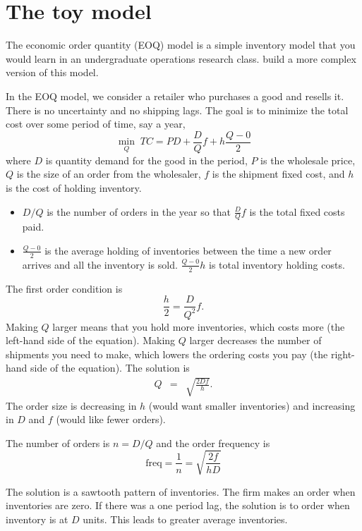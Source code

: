 \documentclass[11pt, pdftex]{article}
\begin{document}
\section{The toy model}
The economic order quantity (EOQ) model is a simple inventory model that you would learn in an undergraduate operations research class. \citet{alessandriaInvetories} build a more complex version of this model.

In the EOQ model, we consider a retailer who purchases a good and resells it. There is no uncertainty and no shipping lags. The goal is to minimize the total cost over some period of time, say a year,
\begin{equation}
  \min_Q \;TC = PD + \frac{D}{Q}f + h\frac{Q-0}{2}
\end{equation}
where $D$ is quantity demand for the good in the period, $P$ is the wholesale price, $Q$ is the size of an order from the wholesaler, $f$ is the shipment fixed cost, and $h$ is the cost of holding inventory. 
\begin{itemize}
  \item $D/Q$ is the number of orders in the year so that $\frac{D}{Q} f$ is the total fixed costs paid.
  \item $\frac{Q-0}{2}$ is the average holding of inventories between the time a new order arrives and all the inventory is sold. $\frac{Q-0}{2}h$ is total inventory holding costs.
\end{itemize}
The first order condition is
\begin{equation}\label{}
  \frac{h}{2}=\frac{D}{Q^2}f.
\end{equation}
Making $Q$ larger means that you hold more inventories, which costs more (the left-hand side of the equation). Making $Q$ larger decreases the number of shipments you need to make, which lowers the ordering costs you pay (the right-hand side of  the equation). 
The solution is
\begin{eqnarray}
  Q &=& \sqrt{\frac{2Df}{h}}.
\end{eqnarray}
The order size is decreasing in $h$ (would want smaller inventories) and increasing in $D$ and $f$ (would like fewer orders).

The number of orders is $n=D/Q$ and the order frequency is
\begin{equation}\label{eq:freq}
  \text{freq}=\frac{1}{n} = \sqrt{\frac{2f}{hD}}
\end{equation}

The solution is a sawtooth pattern of inventories. The firm makes an order when inventories are zero. If there was a one period lag, the solution is to order when inventory is at $D$ units. This leads to greater average inventories.
\end{document}
